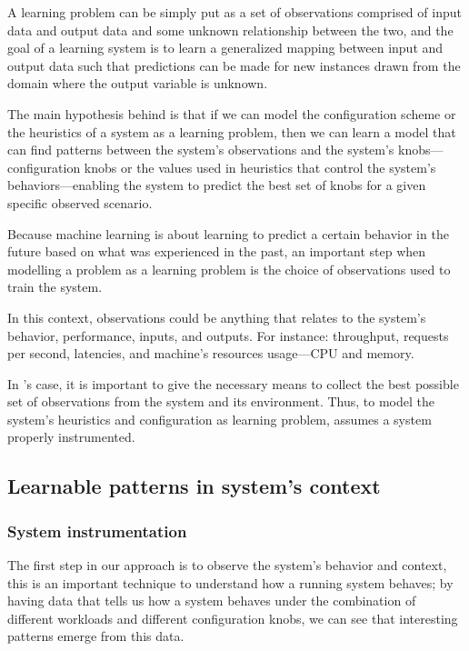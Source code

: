 A learning problem can be simply put as a set of observations comprised of input data and output data and some unknown relationship between the two, and the goal of a learning system is to learn a generalized mapping between input and output data such that predictions can be made for new instances drawn from the domain where the output variable is unknown.

The main hypothesis behind \projectname{} is that if we can model the configuration scheme or the heuristics of a system as a learning problem, then we can learn a model that can find patterns between the system's observations and the system's knobs---configuration knobs or the values used in heuristics that control the system's behaviors---enabling the system to predict the best set of knobs for a given specific observed scenario.

Because machine learning is about learning to predict a certain behavior in the future based on what was experienced in the past, an important step when modelling a problem as a learning problem is the choice of observations used to train the system.

In this context, observations could be anything that relates to the system's behavior, performance, inputs, and outputs. For instance: throughput, requests per second, latencies, and machine's resources usage---CPU and memory.

In \projectname{}'s case, it is important to give the necessary means to collect the best possible set of observations from the system and its environment. Thus, to model the system's heuristics and configuration as learning problem, \projectname{} assumes a system properly instrumented.

\subsection{Learnable patterns in system's context}

\subsubsection{System instrumentation}

The first step in our approach is to observe the system's behavior and context, this is an important technique to understand how a running system behaves; by having data that tells us how a system behaves under the combination of different workloads and different configuration knobs, we can see that interesting patterns emerge from this data.

